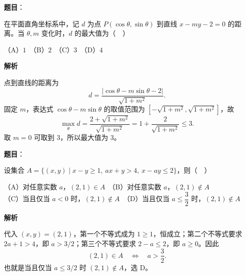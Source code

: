\begin{answer}

\textbf{题目}：

在平面直角坐标系中，记 $d$ 为点 $P(\cos\theta,\sin\theta)$ 到直线 $x-my-2=0$ 的距离。当 $\theta,m$ 变化时，$d$ 的最大值为（　）

（A）$1$　（B）$2$　（C）$3$　（D）$4$

\textbf{解析}

点到直线的距离为
\nopagebreak[4]
\[
d=\frac{|\cos\theta-m\sin\theta-2|}{\sqrt{1+m^2}}.
\]
固定 $m$，表达式 $\cos\theta-m\sin\theta$ 的取值范围为 $[-\sqrt{1+m^2},\sqrt{1+m^2}]$，故
\nopagebreak[4]
\[
\max_\theta d=\frac{2+\sqrt{1+m^2}}{\sqrt{1+m^2}}
=1+\frac2{\sqrt{1+m^2}}\leqslant3.
\]
取 $m=0$ 可取到 $3$，所以最大值为 $3$。


\end{answer}
\begin{answer}

\textbf{题目}：

设集合 $A=\{(x,y)\mid x-y\geqslant1,\ ax+y>4,\ x-ay\leqslant2\}$，则（　）

（A）对任意实数 $a$，$(2,1)\in A$　（B）对任意实数 $a$，$(2,1)\notin A$\\
（C）当且仅当 $a<0$ 时，$(2,1)\notin A$　（D）当且仅当 $a\leqslant\dfrac32$ 时，$(2,1)\notin A$

\textbf{解析}

代入 $(x,y)=(2,1)$，第一个不等式成为 $1\geqslant1$，恒成立；第二个不等式要求 $2a+1>4$，即 $a>3/2$；第三个不等式要求 $2-a\leqslant2$，即 $a\geqslant0$。因此
\nopagebreak[4]
\[
(2,1)\in A\quad\Longleftrightarrow\quad a>\frac32.
\]
也就是当且仅当 $a\leqslant3/2$ 时 $(2,1)\notin A$，选 D。


\end{answer}

